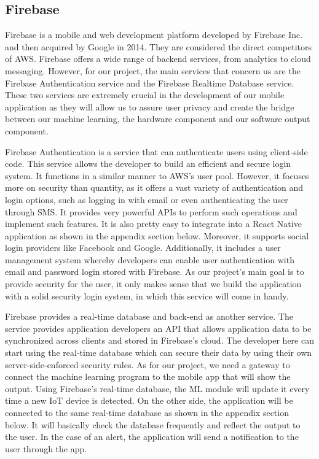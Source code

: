\documentclass{article}
\begin{document}
\subsection{Firebase}
Firebase is a mobile and web development platform developed by Firebase Inc. and then acquired by Google in 2014. They are considered the direct competitors of AWS. Firebase offers a wide range of backend services, from analytics to cloud messaging. However, for our project, the main services that concern us are the Firebase Authentication service and the Firebase Realtime Database service. These two services are extremely crucial in the development of our mobile application as they will allow us to assure user privacy and create the bridge between our machine learning, the hardware component and our software output component. \newline

Firebase Authentication is a service that can authenticate users using client-side code. This service allows the developer to build an efficient and secure login system. It functions in a similar manner to AWS’s user pool. However, it focuses more on security than quantity, as it offers a vast variety of authentication and login options, such as logging in with email or even authenticating the user through SMS. It provides very powerful APIs to perform such operations and implement such features. It is also pretty easy to integrate into a React Native application as shown in the appendix section below. Moreover, it supports social login providers like Facebook and Google. Additionally, it includes a user management system whereby developers can enable user authentication with email and password login stored with Firebase. As our project’s main goal is to provide security for the user, it only makes sense that we build the application with a solid security login system, in which this service will come in handy.\newline

Firebase provides a real-time database and back-end as another service. The service provides application developers an API that allows application data to be synchronized across clients and stored in Firebase's cloud. The developer here can start using the real-time database which can secure their data by using their own server-side-enforced security rules. As for our project, we need a gateway to connect the machine learning program to the mobile app that will show the output. Using Firebase’s real-time database, the ML module will update it every time a new IoT device is detected. On the other side, the application will be connected to the same real-time database as shown in the appendix section below. It will basically check the database frequently and reflect the output to the user. In the case of an alert, the application will send a notification to the user through the app.
\end{document}
